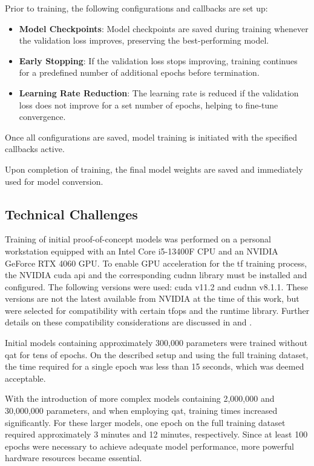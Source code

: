 {Prior to training, the following configurations and callbacks are set up:

\begin{itemize}
\item \textbf{Model Checkpoints}: Model checkpoints are saved during training whenever the validation loss improves, preserving the best-performing model.
\item \textbf{Early Stopping}: If the validation loss stops improving, training continues for a predefined number of additional epochs before termination.
\item \textbf{Learning Rate Reduction}: The learning rate is reduced if the validation loss does not improve for a set number of epochs, helping to fine-tune convergence.
\end{itemize}

Once all configurations are saved, model training is initiated with the specified callbacks active.

Upon completion of training, the final model weights are saved and immediately used for model conversion.

\subsection*{Technical Challenges}

Training of initial proof-of-concept models was performed on a personal workstation equipped with an Intel Core i5-13400F CPU and an NVIDIA GeForce RTX 4060 GPU.
To enable GPU acceleration for the \gls{tf} training process, the NVIDIA \gls{cuda} \gls{api} and the corresponding \gls{cudnn} library must be installed and configured.
The following versions were used: \gls{cuda} v11.2 and \gls{cudnn} v8.1.1.
These versions are not the latest available from NVIDIA at the time of this work, but were selected for compatibility with certain \glspl{tfop} and the  runtime library.
Further details on these compatibility considerations are discussed in  and .

Initial models containing approximately 300,000 parameters were trained without \gls{qat} for tens of epochs.
On the described setup and using the full training dataset, the time required for a single epoch was less than 15 seconds, which was deemed acceptable.


With the introduction of more complex models containing 2,000,000 and 30,000,000 parameters, and when employing \gls{qat}, training times increased significantly.
For these larger models, one epoch on the full training dataset required approximately 3 minutes and 12 minutes, respectively.
Since at least 100 epochs were necessary to achieve adequate model performance, more powerful hardware resources became essential.

}

